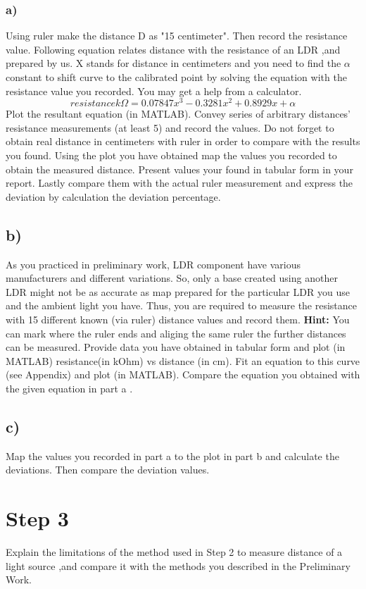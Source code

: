 \documentclass[letterpaper,12pt]{article}
\begin{document}
\subsubsection*{a)}
Using ruler make the distance D as "15 centimeter". Then record the resistance value. Following equation relates distance with the resistance of an LDR ,and prepared by us. X stands for distance in centimeters and you need to find the \(\alpha\) constant to shift curve to the calibrated point by solving the equation with the resistance value you recorded. You may get a help from a calculator.
\[resistance   k\Omega = 0.07847 x^3 -0.3281 x^2 + 0.8929x + \alpha\] 
Plot the resultant equation (in MATLAB). Convey series of arbitrary distances' resistance measurements (at least 5) and record the values. Do not forget to obtain real distance in centimeters with  ruler in order to compare with the results you found. Using the plot you have obtained map the values you recorded to obtain the measured distance. Present  values your found in tabular form in your report. Lastly compare them with the actual ruler measurement and express the deviation by calculation the deviation percentage.\\
\subsection*{b)}
As you practiced in preliminary work, LDR component have various manufacturers and different variations. So, only a base created using another LDR might not be as accurate as map prepared for the particular LDR you use and the ambient light you have. Thus, you are required to measure the resistance with 15 different known (via ruler) distance values and record them. \textbf{Hint:} You can mark where the ruler ends and aliging the same ruler the further distances can be measured. Provide data you have obtained in tabular form and plot (in MATLAB) resistance(in kOhm) vs distance (in cm). Fit an equation to this curve (see Appendix) and plot (in MATLAB). Compare the equation you obtained with the given equation in part a . 
\subsection*{c)}
Map the values you recorded in part a to the plot in part b and calculate the deviations. Then compare the deviation values.
\section*{Step 3} 
Explain the limitations of the method used in Step 2 to measure distance of a light source ,and compare it with the methods you described in the Preliminary Work.
\end{document}
